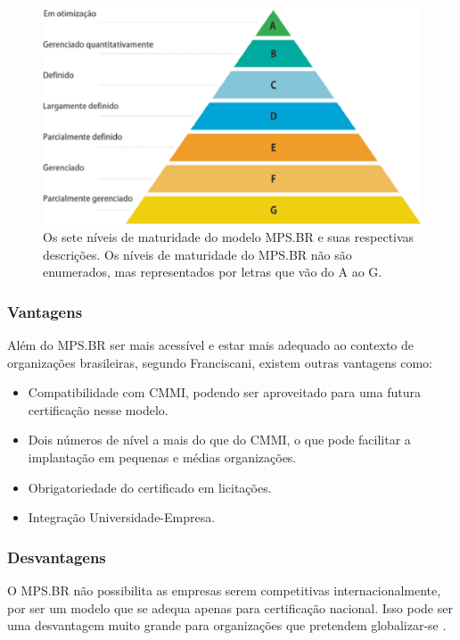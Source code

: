   \begin{figure}[!ht]
    \centering
    \includegraphics[width=15cm, keepaspectratio=true]{figuras/maturidade/niveis-mpsbr.eps}
    \caption{Os sete níveis de maturidade do modelo MPS.BR e suas respectivas descrições. Os
              níveis de maturidade do MPS.BR não são enumerados, mas representados por letras
              que vão do A ao G.}
  \end{figure}

    \subsubsection{Vantagens}

    Além do MPS.BR ser mais acessível e estar mais adequado ao contexto de
    organizações brasileiras, segundo Franciscani, existem outras vantagens
    como:

    \begin{itemize}
      \item{Compatibilidade com CMMI, podendo ser aproveitado para uma futura
            certificação nesse modelo.}
      \item{Dois números de nível a mais do que do CMMI, o que pode facilitar a
            implantação em pequenas e médias organizações.}
      \item{Obrigatoriedade do certificado em licitações.}
      \item{Integração Universidade-Empresa.}
    \end{itemize}

    \subsubsection{Desvantagens}

    O MPS.BR não possibilita as empresas serem competitivas internacionalmente,
    por ser um modelo que se adequa apenas para certificação nacional. Isso pode
    ser uma desvantagem muito grande para organizações que pretendem
    globalizar-se \cite{francis2012}.


